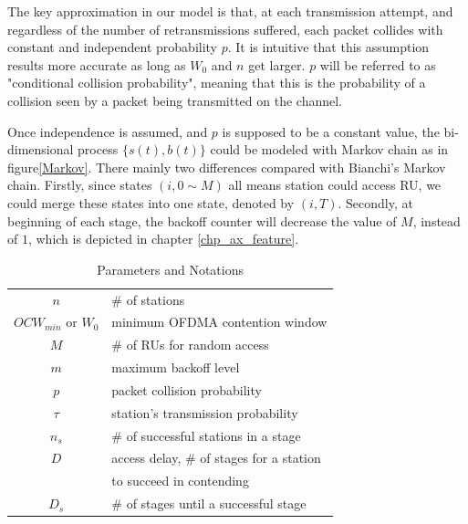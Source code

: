 The key approximation in our model is that, at each transmission attempt, and regardless of the number of retransmissions suffered, each packet collides with constant and independent probability $p$. It is intuitive that this assumption results more accurate as long as $W_0$ and $n$ get larger. $p$ will be referred to as "conditional collision probability", meaning that this is the probability of a collision seen by a packet being transmitted on the channel.

Once independence is assumed, and $p$ is supposed to be a constant value, the bi-dimensional process $\lbrace s(t),b(t) \rbrace$ could be modeled with Markov chain as in figure\ref{Markov}. 
There mainly two differences compared with Bianchi's Markov chain.
Firstly, since states $( i,0\sim M )$ all means station could access RU, we could merge these states into one state, denoted by $( i, T )$. 
Secondly, at beginning of each stage, the backoff counter will decrease the value of $M$, instead of $1$, which is depicted in chapter \ref{chp_ax_feature}.
\begin{table}[!b]
\caption{Parameters and Notations}
\centering
\label{table_notation}
\begin{tabular}{c|l}
\hline
$n$						& $\#$ of stations \\
$OCW_{min}$ or $W_0$		& minimum OFDMA contention window \\
$M$						& $\#$ of RUs for random access \\
$m$						& maximum backoff level \\
$p$						& packet collision probability \\
$\tau$					& station's transmission probability \\
$n_s$					& $\#$ of successful stations in a stage \\
$D$			            & access delay, $\#$ of stages for a station \\ & to succeed in contending \\
$D_s$					& $\#$ of stages until a successful stage \\
\hline
\end{tabular}
\end{table}


